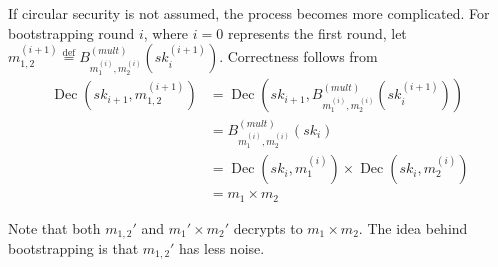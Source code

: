 If circular security is not assumed, the process becomes more complicated. For bootstrapping round $i$, where $i = 0$ represents the first round, let $m_{1,2}^{(i+1)} \stackrel{\mathrm{def}}{=} B_{m_1^{(i)},m_2^{(i)}}^{(mult)}(sk_i^{(i+1)})$. Correctness follows from
\begin{equation*}
    \begin{aligned}
        \operatorname{Dec}(sk_{i+1}, m_{1,2}^{(i+1)}) &= \operatorname{Dec}(sk_{i+1}, B_{m_1^{(i)},m_2^{(i)}}^{(mult)}(sk_i^{(i+1)})) \\
        &= B_{m_1^{(i)},m_2^{(i)}}^{(mult)}(sk_i)\\
        &= \operatorname{Dec}(sk_i, m_1^{(i)}) \times \operatorname{Dec}(sk_i, m_2^{(i)})\\
        &= m_1 \times m_2
    \end{aligned}
\end{equation*}

Note that both $m_{1,2}'$ and $m_1' \times m_2'$ decrypts to $m_1 \times m_2$. The idea behind bootstrapping is that $m_{1,2}'$ has less noise.
